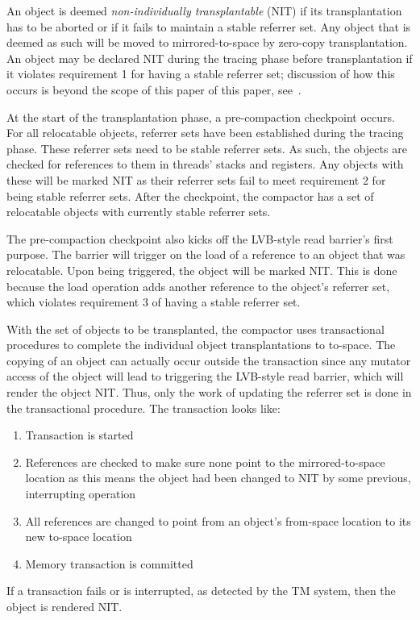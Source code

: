 \documentclass{sig-alternate}
\begin{document}
An object is deemed \emph{non-individually transplantable} (NIT) if its transplantation
has to be aborted or if it fails to maintain a stable referrer set. 
Any object that is deemed as such will be moved to mirrored-to-space by zero-copy 
transplantation. An object may be declared NIT during the tracing phase before transplantation
if it violates requirement 1 for having a stable referrer set; discussion
of how this occurs is beyond the scope of this paper of this paper, see~\cite{Iyengar:Collie}.

At the start of the transplantation phase, a pre-compaction checkpoint occurs.
For all relocatable objects, referrer sets have been established during the tracing phase.
These referrer sets need to be stable referrer sets. As such, the objects are checked for 
references to them in threads' stacks and registers. Any objects with these will be 
marked NIT as their referrer sets fail to meet requirement 2 for being stable referrer sets.
After the checkpoint, the compactor has a set of relocatable objects with currently stable referrer sets.

The pre-compaction checkpoint also kicks off the LVB-style read barrier's first purpose. 
The barrier will trigger on the load of a reference to an object that was 
relocatable. Upon being triggered, the object will be marked NIT. This is done because
the load operation adds another reference to the object's referrer set, which violates
requirement 3 of having a stable referrer set.

With the set of objects to be transplanted, the compactor uses transactional
procedures to complete the individual object transplantations to to-space.
The copying of an object can actually occur outside the transaction since any
mutator access of the object will lead to triggering the LVB-style read barrier,
which will render the object NIT. Thus, only the work of updating the referrer set
is done in the transactional procedure. The transaction looks like:
\begin{enumerate}
\item Transaction is started
\item References are checked to make sure none point to the mirrored-to-space location as this means the object had been changed to NIT by some previous, interrupting operation
\item All references are changed to point from an object's from-space location to its new to-space location
\item Memory transaction is committed
\end{enumerate}
If a transaction fails or is interrupted, as detected by the TM system, then the object is rendered NIT.
\end{document}

